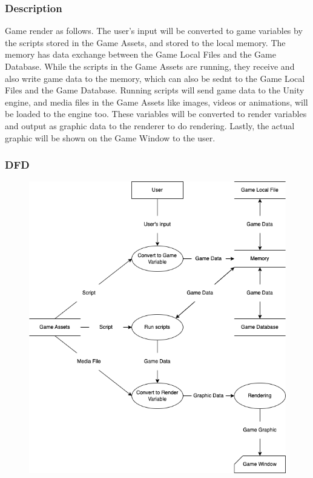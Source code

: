 \documentclass[11pt]{article}
\begin{document}
\subsubsection{Description}
Game render as follows. The user's input will be converted to game variables by the scripts stored in the Game Assets, and stored to the local memory. The memory has data exchange between the Game Local Files and the Game Database. While the scripts in the Game Assets are running, they receive and also write game data to the memory, which can also be sednt to the Game Local Files and the Game Database. Running scripts will send game data to the Unity engine, and media files in the Game Assets like images, videos or animations, will be loaded to the engine too. These variables will be converted to render variables and output as graphic data to the renderer to do rendering. Lastly, the actual graphic will be shown on the Game Window to the user.
\subsubsection{DFD}
\begin{figure}[H]
    \centering
    \includegraphics*[scale=0.4]{Master_DFD.png}
\end{figure}
\end{document}

